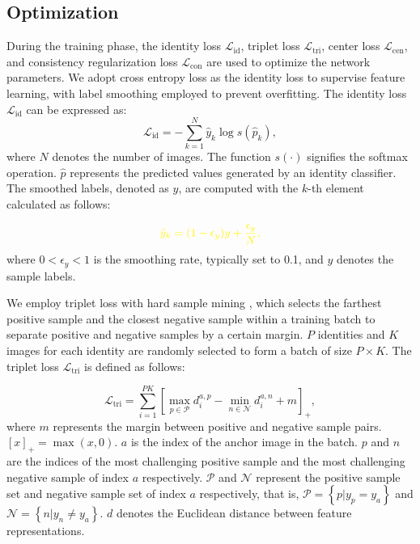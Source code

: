 \documentclass[12pt]{spieman}  %
\begin{document}
\begin{spacing}{2}
		\subsection{Optimization}
		During the training phase, the identity loss $\mathcal{L}_{\text{id}}$, triplet loss $\mathcal{L}_{\text{tri}}$, center loss $\mathcal{L}_{\text{cen}}$, and consistency regularization loss $\mathcal{L}_{\text{con}}$ are used to optimize the network parameters. We adopt cross entropy loss as the identity loss to supervise feature learning, with label smoothing \cite{szegedy2016rethinking} employed to prevent overfitting. The identity loss $\mathcal{L}_{\text{id}}$ can be expressed as:
		\begin{equation}
			\mathcal{L}_{\text{id}}=-\sum_{k=1}^{N}\hat{y}_{k}\log s(\hat{p}_{k}),
		\end{equation}
		where $N$ denotes the number of images. The function $s(\cdot)$ signifies the softmax operation. $\hat{p}$ represents the predicted values generated by an identity classifier. The smoothed labels, denoted as $\hat{y}$, are computed with the $k$-th element calculated as follows:
		
		\begin{equation}
			\textcolor{yellow}{\hat{y}_k=(1-\epsilon_{y})y+\frac{\epsilon_y}{N},}
		\end{equation}
		where $0 < \epsilon_y < 1$ is the smoothing rate, typically set to 0.1, and $y$ denotes the sample labels.
		
		We employ triplet loss with hard sample mining \cite{luo2019bag}, which selects the farthest positive sample and the closest negative sample within a training batch to separate positive and negative samples by a certain margin. $P$ identities and $K$ images for each identity are randomly selected to form a batch of size $P \times K$. The triplet loss $\mathcal{L}_{\text{tri}}$ is defined as follows:
		
		\begin{equation}
			\mathcal{L}_{\text{tri}}=\sum_{i=1}^{PK}\left[\operatorname*{max}_{p\in\mathcal{P}}d_i^{a,p}-\operatorname*{min}_{n\in\mathcal{N}}d_i^{a,n}+m\right]_{+},
		\end{equation}
		where $m$ represents the margin between positive and negative sample pairs. $\left[x\right]_{+} = \max(x,0)$. $a$ is the index of the anchor image in the batch. $p$ and $n$ are the indices of the most challenging positive sample and the most challenging negative sample of index $a$ respectively. $\mathcal P$ and $\mathcal N$ represent the positive sample set and negative sample set of index $a$ respectively, that is, $\mathcal P =\left\{ p|y_p = y_a \right\}$ and $\mathcal N = \left\{ n|y_n \neq y_a\right\}$. $d$ denotes the Euclidean distance between feature representations.
		

\end{spacing}
\end{document}
